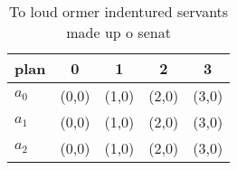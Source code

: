 \documentclass[a4paper]{article}
\begin{document}
\begin{table}
\begin{adjustbox}{width=0.6\columnwidth}
\begin{tabular}{|l|l|l|l|l|}
\hline
\textbf{plan} & \multicolumn{1}{c|}{\textbf{0}} & \multicolumn{1}{c|}{\textbf{1}} & \multicolumn{1}{c|}{\textbf{2}} & \multicolumn{1}{c|}{\textbf{3}} \\ \hline
\textbf{$a_0$}  & (0,0) & (1,0) & (2,0) & (3,0) \\ \hline
\textbf{$a_1$}  & (0,0) & (1,0) & (2,0) & (3,0) \\ \hline
\textbf{$a_2$}  & (0,0) & (1,0) & (2,0) & (3,0) \\ \hline
\end{tabular}
\end{adjustbox}
\caption{To loud ormer indentured servants made up o senat
}
\end{table}
\end{document}
